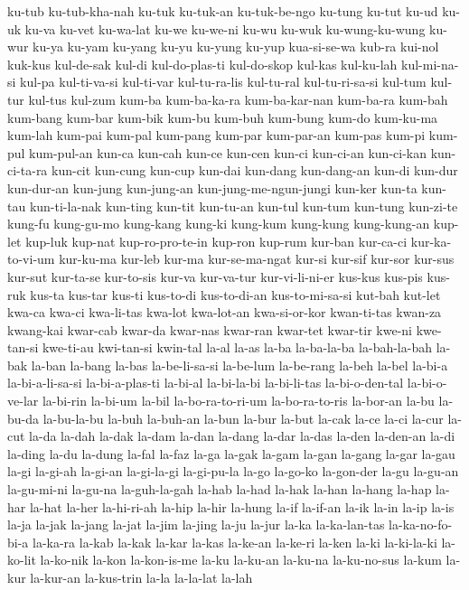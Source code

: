 {ku-tub ku-tub-kha-nah ku-tuk ku-tuk-an ku-tuk-be-ngo ku-tung ku-tut ku-ud
ku-uk ku-va ku-vet ku-wa-lat ku-we ku-we-ni ku-wu ku-wuk ku-wung-ku-wung
ku-wur ku-ya ku-yam ku-yang ku-yu ku-yung ku-yup kua-si-se-wa kub-ra
kui-nol kuk-kus kul-de-sak kul-di kul-do-plas-ti kul-do-skop kul-kas
kul-ku-lah kul-mi-na-si kul-pa kul-ti-va-si kul-ti-var kul-tu-ra-lis
kul-tu-ral kul-tu-ri-sa-si kul-tum kul-tur kul-tus kul-zum kum-ba
kum-ba-ka-ra kum-ba-kar-nan kum-ba-ra kum-bah kum-bang kum-bar kum-bik
kum-bu kum-buh kum-bung kum-do kum-ku-ma kum-lah kum-pai kum-pal kum-pang
kum-par kum-par-an kum-pas kum-pi kum-pul kum-pul-an kun-ca kun-cah kun-ce
kun-cen kun-ci kun-ci-an kun-ci-kan kun-ci-ta-ra kun-cit kun-cung kun-cup
kun-dai kun-dang kun-dang-an kun-di kun-dur kun-dur-an kun-jung
kun-jung-an kun-jung-me-ngun-jungi kun-ker kun-ta kun-tau kun-ti-la-nak
kun-ting kun-tit kun-tu-an kun-tul kun-tum kun-tung kun-zi-te kung-fu
kung-gu-mo kung-kang kung-ki kung-kum kung-kung kung-kung-an kup-let
kup-luk kup-nat kup-ro-pro-te-in kup-ron kup-rum kur-ban kur-ca-ci
kur-ka-to-vi-um kur-ku-ma kur-leb kur-ma kur-se-ma-ngat kur-si kur-sif
kur-sor kur-sus kur-sut kur-ta-se kur-to-sis kur-va kur-va-tur
kur-vi-li-ni-er kus-kus kus-pis kus-ruk kus-ta kus-tar kus-ti kus-to-di
kus-to-di-an kus-to-mi-sa-si kut-bah kut-let kwa-ca kwa-ci kwa-li-tas
kwa-lot kwa-lot-an kwa-si-or-kor kwan-ti-tas kwan-za kwang-kai kwar-cab
kwar-da kwar-nas kwar-ran kwar-tet kwar-tir kwe-ni kwe-tan-si kwe-ti-au
kwi-tan-si kwin-tal la-al la-as la-ba la-ba-la-ba la-bah-la-bah la-bak
la-ban la-bang la-bas la-be-li-sa-si la-be-lum la-be-rang la-beh la-bel
la-bi-a la-bi-a-li-sa-si la-bi-a-plas-ti la-bi-al la-bi-la-bi la-bi-li-tas
la-bi-o-den-tal la-bi-o-ve-lar la-bi-rin la-bi-um la-bil la-bo-ra-to-ri-um
la-bo-ra-to-ris la-bor-an la-bu la-bu-da la-bu-la-bu la-buh la-buh-an
la-bun la-bur la-but la-cak la-ce la-ci la-cur la-cut la-da la-dah la-dak
la-dam la-dan la-dang la-dar la-das la-den la-den-an la-di la-ding la-du
la-dung la-fal la-faz la-ga la-gak la-gam la-gan la-gang la-gar la-gau
la-gi la-gi-ah la-gi-an la-gi-la-gi la-gi-pu-la la-go la-go-ko la-gon-der
la-gu la-gu-an la-gu-mi-ni la-gu-na la-guh-la-gah la-hab la-had la-hak
la-han la-hang la-hap la-har la-hat la-her la-hi-ri-ah la-hip la-hir
la-hung la-if la-if-an la-ik la-in la-ip la-is la-ja la-jak la-jang la-jat
la-jim la-jing la-ju la-jur la-ka la-ka-lan-tas la-ka-no-fo-bi-a la-ka-ra
la-kab la-kak la-kar la-kas la-ke-an la-ke-ri la-ken la-ki la-ki-la-ki
la-ko-lit la-ko-nik la-kon la-kon-is-me la-ku la-ku-an la-ku-na
la-ku-no-sus la-kum la-kur la-kur-an la-kus-trin la-la la-la-lat la-lah
}
